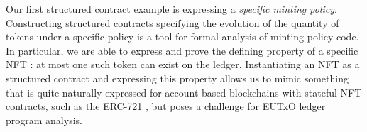 %
%
%
%
\label{sec:mit-example}

Our first structured contract example is expressing a \emph{specific minting policy}.
Constructing structured contracts specifying the evolution of the quantity of tokens
under a specific policy is a tool for formal analysis of minting policy code. In particular,
we are able to express and prove the defining property of a specific NFT : at most one
such token can exist on the ledger. Instantiating an NFT as a structured contract
and expressing this property allows us to mimic something that is quite naturally
expressed for account-based blockchains with stateful NFT contracts, such as the
ERC-721 \cite{erc721}, but poses a challenge for EUTxO ledger program analysis.

